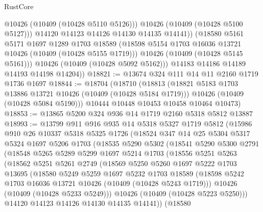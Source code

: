 \begin{lexlean}{RustCore}
\begin{coremodule}
                  @10426
                  (@10409 (@10428 @5110 @5126)))
                @10426
                (@10409 (@10428 @5100 @5127)))
              @14120
              @14123
              @14126
              @14130
              @14135
              @14141))
          (@18580
            @5161
            @5171
            @1697
            @1289
            @1703
            @18589
            (@18598 @5154 @1703 @16036 @13721 @10426 (@10409 (@10428 @5155 @1719)))
            @10426
            (@10409 (@10428 @5145 @5161)))
          @10426
          (@10409 (@10428 @5092 @5162)))
        @14183
        @14186
        @14189
        @14193
        @14198
        @14204))
@18821 := @13674 @324 @111 @14 @11 @2160 @1719 @1736 @1697
@18844 := @18704
    (@18710
      (@18813
        (@18821 @5183 @1703 @13886 @13721 @10426 (@10409 (@10428 @5184 @1719)))
        @10426
        (@10409 (@10428 @5084 @5190)))
      @10444
      @10448
      @10453
      @10458
      @10464
      @10473)
@18853 := @13865 @5200 @324 @936 @14 @1719 @2160 @5318 @5812 @13887
@18993 := @13799
    @911
    @916
    @935
    @14
    @5318
    @5327
    @1719
    @5812
    (@15986
      @910
      @26
      @10337
      @5318
      @5325
      @1726
      (@18524
        @347
        @14
        @25
        @5304
        @5317
        @5324
        @1697
        @5206
        @1703
        (@18535
          @5290
          @5302
          (@18541
            @5290
            @5300
            @2791
            (@18548
              @5265
              @5289
              @5299
              @1697
              @5214
              @1703
              (@18556
                @5251
                @5263
                (@18562
                  @5251
                  @5261
                  @2749
                  (@18569
                    @5250
                    @5260
                    @1697
                    @5222
                    @1703
                    @13695
                    (@18580
                      @5249
                      @5259
                      @1697
                      @5232
                      @1703
                      @18589
                      (@18598 @5242 @1703 @16036 @13721 @10426 (@10409 (@10428 @5243 @1719)))
                      @10426
                      (@10409 (@10428 @5233 @5249)))
                    @10426
                    (@10409 (@10428 @5223 @5250)))
                  @14120
                  @14123
                  @14126
                  @14130
                  @14135
                  @14141))
              (@18580

\end{coremodule}
\end{lexlean}
